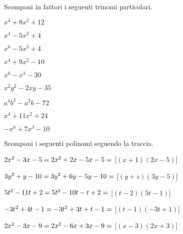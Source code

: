 \begin{esercizio}
 \label{ese:17.5}
 Scomponi in fattori i seguenti trinomi particolari.
 \begin{multicols}{3}
 \begin{enumeratea}
 \item \(x^{4}+8x^{2}+12\)
 \item \(x^{4}-5x^{2}+4\)
 \item \(x^{6}-5x^{3}+4\)
 \item \(x^{4}+9x^{2}-10\)
 \item \(x^{6}-x^{3}-30\)
 \item \(x^{2}y^{2}-2xy-35\)
 \item \(a^{4}b^{2}-a^{2}b-72\)
 \item \(x^{4}+11x^{2}+24\)
 \item \(-x^{6}+7x^{3}-10\)
 \end{enumeratea}
\end{multicols}
\end{esercizio}

\begin{esercizio}[\Ast]
 \label{ese:17.9}
 Scomponi i seguenti polinomi seguendo la traccia.
 \begin{enumeratea}
 \item \(2x^{{2}}-3x-5=2x^{2}+2x-5x-5=\dotfill\) \hfill 
  [\((x+1)(2x-5)\)]
 \item \(3y^{{2}}+y-10 = 3y^{2}+6y-5y-10 =\dotfill\) \hfill 
  [\((y+z)(3y-5)\)]
 \item \(5t^{{2}}-11t+2 = 5t^{2}-10t-t+2 =\dotfill\) \hfill 
  [\((t-2)(5t-1)\)]
 \item \(-3t^{{2}}+4t-1= -3t^{2}+3t+t-1 = \dotfill\) \hfill 
  [\((t-1)(-3t+1)\)]
 \item \(2x^{2}-3x-9= 2x^{2}-6x+3x-9 = \dotfill\) \hfill 
  [\((x-3)\left(2x+3\right)\)]
 \end{enumeratea}
\end{esercizio}


